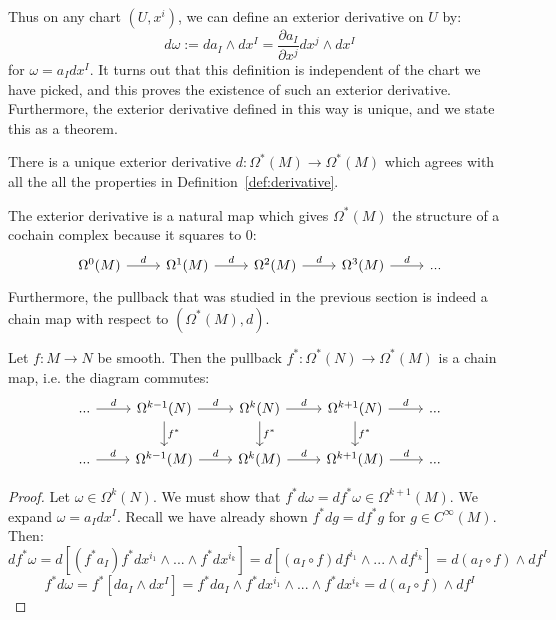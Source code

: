 Thus on any chart $(U, x^i)$, we can define an exterior derivative on $U$ by:
\begin{equation}
	d\omega := da_I\wedge dx^I = \frac{\partial a_I}{\partial x^j} dx^j\wedge dx^I
\end{equation}
for $\omega = a_I dx^I$. It turns out that this definition is independent of the chart we have picked, and this proves the 
existence of such an exterior derivative. Furthermore, the exterior derivative defined in this way is unique, and we state 
this as a theorem.
\begin{theorem}
	There is a unique exterior derivative $d : \Omega^*(M)\rightarrow\Omega^*(M)$ which agrees with all the all the 
	properties in Definition~\ref{def:derivative}. 
\end{theorem}

The exterior derivative is a natural map which gives $\Omega^*(M)$ the structure of a cochain complex because it squares to 
0:
\begin{equation}\begin{tikzcd}
	\Omega^0(M)\arrow[r, "d"] & \Omega^1(M) \arrow[r, "d"] & \Omega^2(M)\arrow[r, "d"] & \Omega^3(M)\arrow[r, "d"] & ...
\end{tikzcd}\end{equation}
Furthermore, the pullback that was studied in the previous section is indeed a chain map with respect to $(\Omega^*(M), d)$. 
\begin{theorem}
	Let $f : M\rightarrow N$ be smooth. Then the pullback $f^* : \Omega^*(N)\rightarrow\Omega^*(M)$ is a chain map, 
	i.e. the diagram commutes:
	\begin{equation}\begin{tikzcd}
		...\arrow[r, "d"] & \Omega^{k - 1}(N)\arrow[r, "d"]\arrow[d, "f^*"] & \Omega^k(N)\arrow[r, "d"]\arrow[d, "f^*"] &
		\Omega^{k + 1}(N)\arrow[r, "d"]\arrow[d, "f^*"] & ... \\
		...\arrow[r, "d"] & \Omega^{k - 1}(M)\arrow[r, "d"] & \Omega^k(M)\arrow[r, "d"] & \Omega^{k + 1}(M)\arrow[r, "d"] & 
		...
	\end{tikzcd}\end{equation}
\end{theorem}
\begin{proof}
	Let $\omega\in\Omega^k(N)$. We must show that $f^* d\omega = d f^*\omega\in\Omega^{k + 1}(M)$. We expand 
	$\omega = a_I dx^I$. Recall we have already shown $f^* dg = df^* g$ for $g\in C^\infty(M)$. Then:
	\begin{equation}
		df^*\omega = d\left[(f^* a_I) f^* dx^{i_1}\wedge ... \wedge f^* dx^{i_k}\right] = d\left[(a_I\circ f) df^{i_1}\wedge ... 
		\wedge df^{i_k}\right] = d(a_I\circ f)\wedge df^I
	\end{equation}
	\begin{equation}
		f^*d\omega = f^*\left[da_I\wedge dx^I\right] = f^* da_I\wedge f^* dx^{i_1}\wedge ...\wedge f^* dx^{i_k}
		= d(a_I\circ f)\wedge df^I
	\end{equation}
\end{proof}

